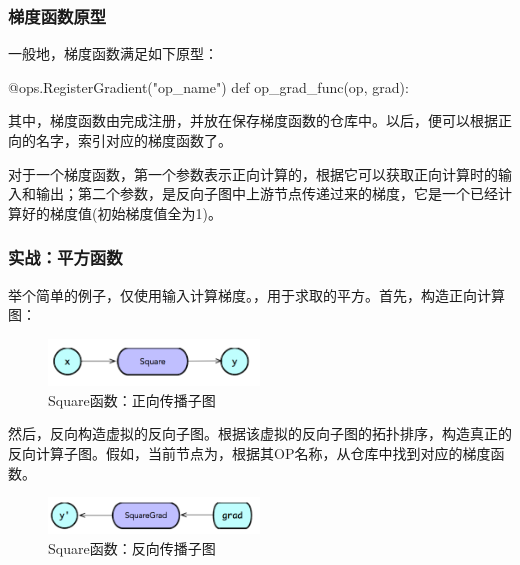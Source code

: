 \begin{content}
\subsubsection{梯度函数原型}

一般地，梯度函数满足如下原型：

\begin{leftbar}
\begin{python}
@ops.RegisterGradient("op_name")
def op_grad_func(op, grad):
\end{python}
\end{leftbar}

其中，梯度函数由完成注册，并放在保存梯度函数的仓库中。以后，便可以根据正向的名字，索引对应的梯度函数了。

对于一个梯度函数，第一个参数表示正向计算的，根据它可以获取正向计算时的输入和输出；第二个参数，是反向子图中上游节点传递过来的梯度，它是一个已经计算好的梯度值(初始梯度值全为1)。

\subsubsection{实战：平方函数}

举个简单的例子，仅使用输入计算梯度。，用于求取的平方。首先，构造正向计算图：

\begin{figure}[!h]
\centering
\includegraphics[width=0.5\textwidth]{figures/bp-square-forward-graph.png}
\caption{Square函数：正向传播子图}
 \label{fig:bp-square-forward-graph}
\end{figure}

然后，反向构造虚拟的反向子图。根据该虚拟的反向子图的拓扑排序，构造真正的反向计算子图。假如，当前节点为，根据其OP名称，从仓库中找到对应的梯度函数。

\begin{figure}[!htbp]
\centering
\includegraphics[width=0.5\textwidth]{figures/bp-square-backward-graph.png}
\caption{Square函数：反向传播子图}
 \label{fig:bp-square-backward-graph}
\end{figure}


\end{content}
